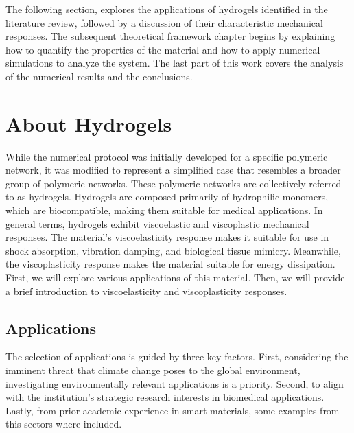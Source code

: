The following section, explores the applications of hydrogels identified in the literature review, followed by a discussion of their characteristic mechanical responses.
The subsequent theoretical framework chapter begins by explaining how to quantify the properties of the material and how to apply numerical simulations to analyze the system.
The last part of this work covers the analysis of the numerical results and the conclusions.

\section{About Hydrogels}

While the numerical protocol was initially developed for a specific polymeric network, it was modified to represent a simplified case that resembles a broader group of polymeric networks.
These polymeric networks are collectively referred to as hydrogels.
Hydrogels are composed primarily of hydrophilic monomers, which are biocompatible, making them suitable for medical applications.
In general terms, hydrogels exhibit viscoelastic and viscoplastic mechanical responses.
The material's viscoelasticity response makes it suitable for use in shock absorption, vibration damping, and biological tissue mimicry.
Meanwhile, the viscoplasticity response makes the material suitable for energy dissipation.
First, we will explore various applications of this material.
Then, we will provide a brief introduction to viscoelasticity and viscoplasticity responses.

\subsection{Applications}

The selection of applications is guided by three key factors. 
First, considering the imminent threat that climate change poses to the global environment, investigating environmentally relevant applications is a priority.
Second, to align with the institution's strategic research interests in biomedical applications.
Lastly, from prior academic experience in smart materials, some examples from this sectors where included.

